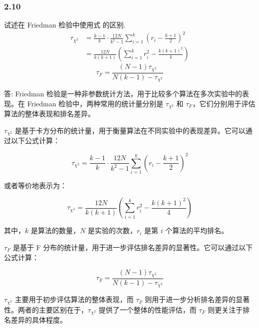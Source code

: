\subsubsection*{2.10}
试述在 Friedman 检验中使用式 的区别.
\begin{align*}
    \tau_{\chi^2} &= \frac{k-1}{k} \cdot \frac{12N}{k^2-1} \sum_{i=1}^{k} \left( r_i - \frac{k+1}{2} \right)^2 \\
    &= \frac{12N}{k(k+1)} \left( \sum_{i=1}^{k} r_i^2 - \frac{k(k+1)^2}{4} \right)
\end{align*}
\begin{equation*}
    \tau_F = \frac{(N-1) \tau_{\chi^2}}{N(k-1) - \tau_{\chi^2}}
\end{equation*}
\par 答:
Friedman 检验是一种非参数统计方法，用于比较多个算法在多次实验中的表现。在 Friedman 检验中，两种常用的统计量分别是 $\tau_{\chi^2}$ 和 $\tau_F$，它们分别用于评估算法的整体表现和排名差异。

$\tau_{\chi^2}$ 是基于卡方分布的统计量，用于衡量算法在不同实验中的表现差异。它可以通过以下公式计算：

\[
\tau_{\chi^2} = \frac{k-1}{k} \cdot \frac{12N}{k^2-1} \sum_{i=1}^{k} \left( r_i - \frac{k+1}{2} \right)^2
\]

或者等价地表示为：

\[
\tau_{\chi^2} = \frac{12N}{k(k+1)} \left( \sum_{i=1}^{k} r_i^2 - \frac{k(k+1)^2}{4} \right)
\]

其中，$k$ 是算法的数量，$N$ 是实验的次数，$r_i$ 是第 $i$ 个算法的平均排名。

$\tau_F$ 是基于 F 分布的统计量，用于进一步评估排名差异的显著性。它可以通过以下公式计算：

\[
\tau_F = \frac{(N-1) \tau_{\chi^2}}{N(k-1) - \tau_{\chi^2}}
\]

$\tau_{\chi^2}$ 主要用于初步评估算法的整体表现，而 $\tau_F$ 则用于进一步分析排名差异的显著性。两者的主要区别在于，$\tau_{\chi^2}$ 提供了一个整体的性能评估，而 $\tau_F$ 则更关注于排名差异的具体程度。

